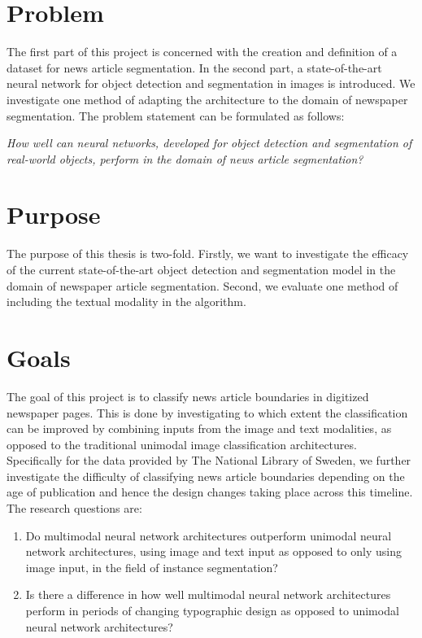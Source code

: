 \documentclass[english, bibtex]{kththesis}
\begin{document}

\section{Problem}
\label{sec:problem}

The first part of this project is concerned with the creation and definition of a dataset for news article segmentation. In the second part, a state-of-the-art neural network for object detection and segmentation in images is introduced. We investigate one method of adapting the architecture to the domain of newspaper segmentation. The problem statement can be formulated as follows:
	
	\textit{How well can neural networks, developed for object detection and segmentation of real-world objects, perform in the domain of news article segmentation?}

\section{Purpose}

The purpose of this thesis is two-fold. Firstly, we want to investigate the efficacy of the current state-of-the-art object detection and segmentation model in the domain of newspaper article segmentation. Second, we evaluate one method of including the textual modality in the algorithm. 

\section{Goals}

The goal of this project is to classify news article boundaries in digitized newspaper pages. This is done by investigating to which extent the classification can be improved by combining inputs from the image and text modalities, as opposed to the traditional unimodal image classification architectures. Specifically for the data provided by The National Library of Sweden, we further investigate the difficulty of classifying news article boundaries depending on the age of publication and hence the design changes taking place across this timeline. The research questions are:

\begin{enumerate}
\item Do multimodal neural network architectures outperform unimodal neural network architectures, using image and text input as opposed to only using image input, in the field of instance segmentation?
\item Is there a difference in how well multimodal neural network architectures perform in periods of changing typographic design as opposed to unimodal neural network architectures?
\end{enumerate}
\end{document}
